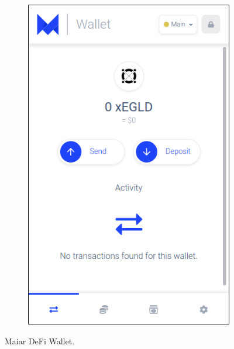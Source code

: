 \documentclass[11pt,a4paper]{article}
\begin{document}
\begin{itemize}
\begin{figure}[!htb]
\begin{subfigure}[b]{0.4\textwidth}
  \caption{}\label{fig:maiarwalleta}
\end{subfigure}\hfill
\begin{subfigure}[b]{0.4\textwidth}
  \includegraphics[width=\linewidth]{maiarextensio2.png}
  \caption{}\label{fig:maiarwalletb}
\end{subfigure}\hfill
\caption{Maiar DeFi Wallet.}\label{fig:maiarwallet}
\end{figure}

\end{itemize}
\end{document}
